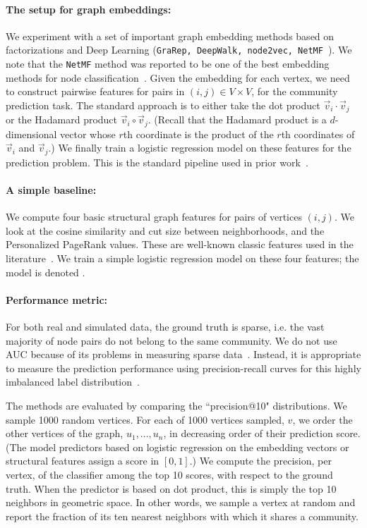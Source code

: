 \documentclass[11pt]{article}
\begin{document}
\paragraph{The setup for graph embeddings:} We experiment with a set of important graph
embedding methods based on factorizations and Deep Learning ({\tt{GraRep, DeepWalk, node2vec, NetMF}}~\cite{PeAlSk14,CaLu15,OuCu16,GrLe16,QiDo18}).
We note that the {\tt NetMF} method was reported to be one of the best embedding methods for node classification~\cite{GuVi+19}.
Given the embedding for each vertex, we need to construct pairwise features for pairs in $(i,j) \in V \times V$,
for the community prediction task.
The standard approach is to either take the dot product $\vec{v}_i \cdot \vec{v}_j$
or the Hadamard product $\vec{v}_i \circ \vec{v}_j$. (Recall 
that the Hadamard product is a $d$-dimensional vector whose $r$th coordinate
is the product of the $r$th coordinates of $\vec{v}_i$ and $\vec{v}_j$.)
We finally train a logistic regression model on these features for the prediction problem.
This is the standard pipeline used in prior work~\cite{covington2016deep,GrLe16,MLGSurvey20}. 

\paragraph{A simple baseline:} We compute four basic structural graph features for pairs
of vertices $(i,j)$. We look at the cosine similarity and cut size between neighborhoods, and
the Personalized PageRank values. These are well-known classic features used in the literature~\cite{SSG17,ACL07}.
We train a simple logistic regression model on these four features; the model is denoted \slr.

\paragraph{Performance metric:} For both real and simulated data, the ground truth is
sparse, i.e. the vast majority of node pairs do not belong to the same
community. We do not use AUC because of its problems in measuring
sparse data~\cite{Ha09,LiCh12}. Instead, it is appropriate to measure the prediction
performance using precision-recall curves for this highly imbalanced
label distribution~\cite{DG06}. 

The methods are evaluated by comparing the ``precision@10" distributions.
We sample 1000 random vertices. For each of 1000 vertices sampled, $v$, 
we order the other vertices of the graph, $u_1, \ldots, u_n$, in decreasing
order of their prediction score. (The model predictors based on logistic regression
on the embedding vectors or structural features assign a score in $[0,1]$.) 
We compute the precision, per vertex, of the classifier among the top 10 scores, 
with respect to the ground truth.
When the predictor is based on dot product, this is simply the top 10 neighbors
in geometric space.
In other words, we sample a vertex at random and report
the fraction of its ten nearest neighbors with which it shares a community.
\end{document}
